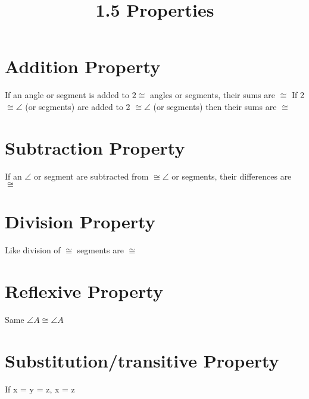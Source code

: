 \documentclass{article}
\begin{document}
	
	\setlength{\droptitle}{-5em}
	\title{1.5 Properties}
	\date{}
	\author{}
	\maketitle
	
	\section{Addition Property}
	If an angle or segment is added to $2 \cong$ angles or segments, their sums are $\cong$ \newline \newline
	If 2 $\cong \angle$ (or segments) are added to 2 $\cong \angle$ (or segments) then their sums are $\cong$
	
	\section{Subtraction Property}
	If an $\angle$ or segment are subtracted from $\cong \angle$ or segments, their differences are $\cong$
	
	\section{Division Property}
	Like division of $\cong$ segments are $\cong$
	
	\section{Reflexive Property}
	Same $\angle A \cong \angle A$
	
	\section{Substitution/transitive Property}
	If x = y = z, x = z
	
	
	
\end{document}

